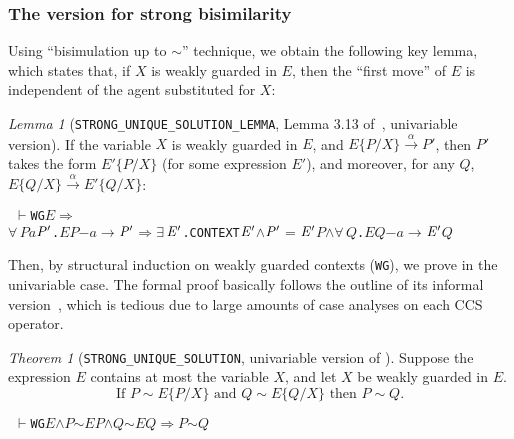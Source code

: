 \documentclass[GCNS]{yincog}
\renewcommand{\HOLConst}[1]{\texttt{#1}}
\renewcommand{\HOLBoundVar}[1]{\ensuremath{\mathit{#1}}}
\renewcommand{\HOLFreeVar}[1]{\ensuremath{\mathit{#1}}}
\renewcommand{\HOLSymConst}[1]{#1}
\renewcommand{\HOLTokenConj}{\ensuremath{\wedge}}
\renewcommand{\HOLTokenExists}{\ensuremath{\exists \,}}
\renewcommand{\HOLTokenForall}{\ensuremath{\forall \,}}
\renewcommand{\HOLTokenTurnstile}{\ensuremath{\:\:\vdash}}
\theoremstyle{remark}
\theoremstyle{theorem}
\newtheorem{lemma}[definition]{Lemma}
\newtheorem{theorem}[definition]{Theorem}
\theoremstyle{remark}
\newcommand{\HOLTokenStrongEQ}{$\sim$}
\newcommand{\HOLTokenTransBegin}{$-$}
\newcommand{\HOLTokenTransEnd}{$\rightarrow$\xspace}
\renewcommand{\HOLTokenImp}{\ensuremath{\Longrightarrow}}
\newcommand{\univariate}{univariable\xspace}
\begin{document}
\subsubsection{The version for strong bisimilarity}
 \label{sec4.10.1}

Using ``bisimulation up to $\sim $'' technique, we obtain the following
key lemma, which states that, if $X$ is weakly guarded in $E$, then the
``first move'' of $E$ is independent of the agent substituted for
$X$:
%
\begin{lemma}[\texttt{STRONG\_UNIQUE\_SOLUTION\_LEMMA}, Lemma 3.13
of~\cite{Mil89}, \univariate version]
 \label{lem:313}
If the variable $X$ is weakly guarded in $E$, and
$E\{P/X\}\overset{\alpha}{\rightarrow} P'$, then $P'$ takes the form
$E'\{P/X\}$ (for some expression $E'$), and moreover, for any $Q$,
$E\{Q/X\}\overset{\alpha}{\rightarrow} E'\{Q/X\}$:
%
\begin{alltt}
\HOLTokenTurnstile{} \HOLConst{WG} \HOLFreeVar{E} \HOLSymConst{\HOLTokenImp{}}
   \HOLSymConst{\HOLTokenForall{}}\HOLBoundVar{P} \HOLBoundVar{a} \ensuremath{\HOLBoundVar{P}\sp{\prime}}. \HOLFreeVar{E} \HOLBoundVar{P} \HOLTokenTransBegin\HOLBoundVar{a}\HOLTokenTransEnd \ensuremath{\HOLBoundVar{P}\sp{\prime}} \HOLSymConst{\HOLTokenImp{}} \HOLSymConst{\HOLTokenExists{}}\ensuremath{\HOLBoundVar{E}\sp{\prime}}. \HOLConst{CONTEXT} \ensuremath{\HOLBoundVar{E}\sp{\prime}} \HOLSymConst{\HOLTokenConj{}} \ensuremath{\HOLBoundVar{P}\sp{\prime}} \HOLSymConst{\ensuremath{=}} \ensuremath{\HOLBoundVar{E}\sp{\prime}} \HOLBoundVar{P} \HOLSymConst{\HOLTokenConj{}} \HOLSymConst{\HOLTokenForall{}}\HOLBoundVar{Q}. \HOLFreeVar{E} \HOLBoundVar{Q} \HOLTokenTransBegin\HOLBoundVar{a}\HOLTokenTransEnd \ensuremath{\HOLBoundVar{E}\sp{\prime}} \HOLBoundVar{Q}
\end{alltt}
%
\end{lemma}

Then, by structural induction on weakly guarded contexts (\texttt{WG}),
we prove  in the \univariate case. The formal proof
basically follows the outline of its informal version~\citep[p.~102--103]{Mil89},
which is tedious due to large amounts of case analyses on each CCS operator.
%
\begin{theorem}[\texttt{STRONG\_UNIQUE\_SOLUTION}, \univariate version
of ]
 \label{thm:Mil89s1f}
Suppose the expression $E$ contains at most the variable $X$, and let
$X$ be weakly guarded in $E$.
%
\begin{equation}
\text{If } P \sim E\{P/X\} \text{ and } Q \sim E\{Q/X\} \text{ then } P
\sim Q.
\end{equation}
%
\begin{alltt}
\HOLTokenTurnstile{} \HOLConst{WG} \HOLFreeVar{E} \HOLSymConst{\HOLTokenConj{}} \HOLFreeVar{P} \HOLSymConst{\HOLTokenStrongEQ} \HOLFreeVar{E} \HOLFreeVar{P} \HOLSymConst{\HOLTokenConj{}} \HOLFreeVar{Q} \HOLSymConst{\HOLTokenStrongEQ} \HOLFreeVar{E} \HOLFreeVar{Q} \HOLSymConst{\HOLTokenImp{}} \HOLFreeVar{P} \HOLSymConst{\HOLTokenStrongEQ} \HOLFreeVar{Q}
\end{alltt}
%
\end{theorem}
\end{document}
